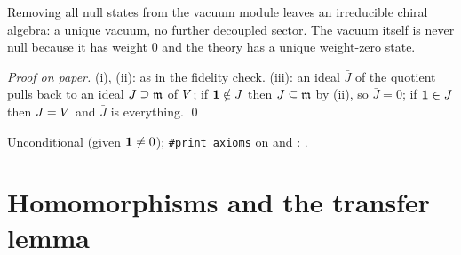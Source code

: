 \begin{physics}
Removing all null states from the vacuum module leaves an irreducible chiral algebra: a unique
vacuum, no further decoupled sector. The vacuum itself is never null because it has weight $0$ and
the theory has a unique weight-zero state.
\end{physics}
\emph{Proof on paper.} (i), (ii): as in the fidelity check. (iii): an ideal $\bar J$ of the quotient
pulls back to an ideal $J\supseteq\mathfrak{m}$ of $V$; if $\mathbf{1}\notin J$ then $J\subseteq\mathfrak{m}$ by
(ii), so $\bar J = 0$; if $\mathbf{1}\in J$ then $J = V$ and $\bar J$ is everything. \qed
\begin{status}
Unconditional (given $\mathbf{1}\ne0$); \texttt{\#print axioms} on \allowbreak{}
and \allowbreak{}\allowbreak{}\allowbreak{}: .
\end{status}

\section{Homomorphisms and the transfer lemma}\label{l04:sec:hom}


